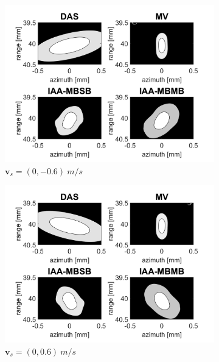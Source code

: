 \begin{figure}[ht]
\begin{subfigure}[t]{0.48\linewidth}
        \includegraphics[width=\linewidth]{./images/results/2.1/motion_90_-06.png}
        \caption{$\boldsymbol{v}_s = (0, -0.6)~m/s$}
        \label{eq:vertical_towards}
    \end{subfigure}
    \quad
    \begin{subfigure}[t]{0.48\linewidth}
        \includegraphics[width=\linewidth]{./images/results/2.1/motion_90_06.png}
        \caption{$\boldsymbol{v}_s = (0, 0.6)~m/s$}
        \label{eq:vertical_away}
    \end{subfigure}
    \quad
    \begin{subfigure}[t]{0.48\linewidth}

\end{subfigure}
\end{figure}
